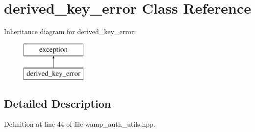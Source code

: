 \hypertarget{classderived__key__error}{}\section{derived\+\_\+key\+\_\+error Class Reference}
\label{classderived__key__error}
Inheritance diagram for derived\+\_\+key\+\_\+error\+:\begin{figure}[H]
\begin{center}
\leavevmode
\includegraphics[height=2.000000cm]{classderived__key__error}
\end{center}
\end{figure}


\subsection{Detailed Description}


Definition at line 44 of file wamp\+\_\+auth\+\_\+utils.\+hpp.

